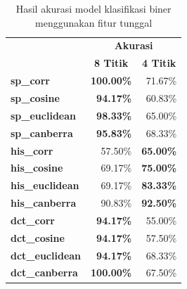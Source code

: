 \begin{table}[!ht]
	\centering
	\caption{Hasil akurasi model klasifikasi biner menggunakan fitur tunggal}
	\vspace{0.5em}
	\begin{tabular}{|l|rr|}
		\hline
		\multirow{2}{*}{}       & \multicolumn{2}{c|}{\textbf{Akurasi}}                                          \\ \cline{2-3}
		                        & \multicolumn{1}{c|}{\textbf{8 Titik}}  & \multicolumn{1}{c|}{\textbf{4 Titik}} \\ \hline
		\textbf{sp\_corr}       & \multicolumn{1}{r|}{\textbf{100.00\%}} & 71.67\%                               \\ \hline
		\textbf{sp\_cosine}     & \multicolumn{1}{r|}{\textbf{94.17\%}}  & 60.83\%                               \\ \hline
		\textbf{sp\_euclidean}  & \multicolumn{1}{r|}{\textbf{98.33\%}}  & 65.00\%                               \\ \hline
		\textbf{sp\_canberra}   & \multicolumn{1}{r|}{\textbf{95.83\%}}  & 68.33\%                               \\ \hline
		\textbf{his\_corr}      & \multicolumn{1}{r|}{57.50\%}           & \textbf{65.00\%}                      \\ \hline
		\textbf{his\_cosine}    & \multicolumn{1}{r|}{69.17\%}           & \textbf{75.00\%}                      \\ \hline
		\textbf{his\_euclidean} & \multicolumn{1}{r|}{69.17\%}           & \textbf{83.33\%}                      \\ \hline
		\textbf{his\_canberra}  & \multicolumn{1}{r|}{90.83\%}           & \textbf{92.50\%}                      \\ \hline
		\textbf{dct\_corr}      & \multicolumn{1}{r|}{\textbf{94.17\%}}  & 55.00\%                               \\ \hline
		\textbf{dct\_cosine}    & \multicolumn{1}{r|}{\textbf{94.17\%}}  & 57.50\%                               \\ \hline
		\textbf{dct\_euclidean} & \multicolumn{1}{r|}{\textbf{94.17\%}}  & 68.33\%                               \\ \hline
		\textbf{dct\_canberra}  & \multicolumn{1}{r|}{\textbf{100.00\%}} & 67.50\%                               \\ \hline
	\end{tabular}
	\label{Tab: 4-hasilfiturtunggal}
\end{table}

